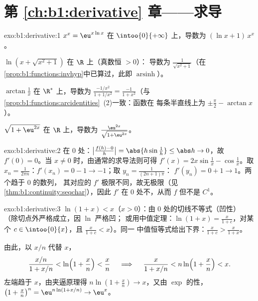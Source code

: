 \section*{第 \ref{ch:b1:derivative} 章——求导}

\begin{solution}{exo:b1:derivative:1}
$x^x = \eu^{x\ln x}$ 在 $\intoo{0}{+\infty}$ 上，导数为 $(\ln x +
1)\,x^x$。

$\ln(x + \sqrt{x^2+1})$ 在 $\R$ 上（真数恒 $> 0$）：
导数为 $\frac{1}{\sqrt{x^2+1}}$（在
\cref{prop:b1:functions:invhyp}中已算过，此即
$\operatorname{arsinh}$）。

$\arctan\frac1x$ 在 $\R^*$ 上，导数为 $\frac{-1/x^2}{1 + 1/x^2} =
\frac{-1}{1 + x^2}$（与
\cref{prop:b1:functions:arcidentities}~(2)一致：函数在
每条半直线上为 $\pm\frac\pi2 - \arctan x$）。

$\sqrt{1 + \eu^{2x}}$ 在 $\R$ 上，导数为
$\frac{\eu^{2x}}{\sqrt{1 + \eu^{2x}}}$。
\end{solution}

\begin{solution}{exo:b1:derivative:2}
在 $0$ 处：$\bigl|\frac{f(h) - 0}{h}\bigr| = \abs{h \sin\frac1h} \leq
\abs h \to 0$，故 $f'(0) = 0$。当 $x \neq 0$ 时，由通常的求导法则可得
$f'(x) = 2x\sin\frac1x - \cos\frac1x$。取 $x_n = \frac{1}{2\pi
n}$：$f'(x_n) = 0 - 1 \to -1$；取 $y_n = \frac{1}{(2n+1)\pi}$：
$f'(y_n) = 0 + 1 \to 1$。两个趋于 $0$ 的数列，
其对应的 $f'$ 极限不同，故无极限（见\cref{thm:b1:continuity:seqchar}），因此 $f'$
在 $0$ 处不，从而 $f$ 但不是
$C^1$。
\end{solution}

\begin{solution}{exo:b1:derivative:3}
$\ln(1+x) < x$（$x > 0$）：由 $0$ 处的切线不等式（凹性）
（除切点外严格成立，因 $\ln$ 严格凹；
或用中值定理：$\ln(1+x) = \frac{x}{1+c}$，对某个
$c \in \intoo{0}{x}$，且 $\frac{x}{1+c} < x$）。同一
中值恒等式给出下界：$\frac{x}{1+c} > \frac{x}{1+x}$。

由此，以 $x/n$ 代替 $x$，
\[
\frac{x/n}{1 + x/n} < \ln\Bigl(1 + \frac xn\Bigr) < \frac xn
\quad\implies\quad
\frac{x}{1 + x/n} < n \ln\Bigl(1 + \frac xn\Bigr) < x .
\]
左端趋于 $x$，由夹逼原理得 $n\ln(1 + \frac xn)
\to x$，又由 $\exp$ 的性，$\bigl(1 + \frac xn\bigr)^n =
\eu^{n\ln(1 + x/n)} \to \eu^x$。
\end{solution}

